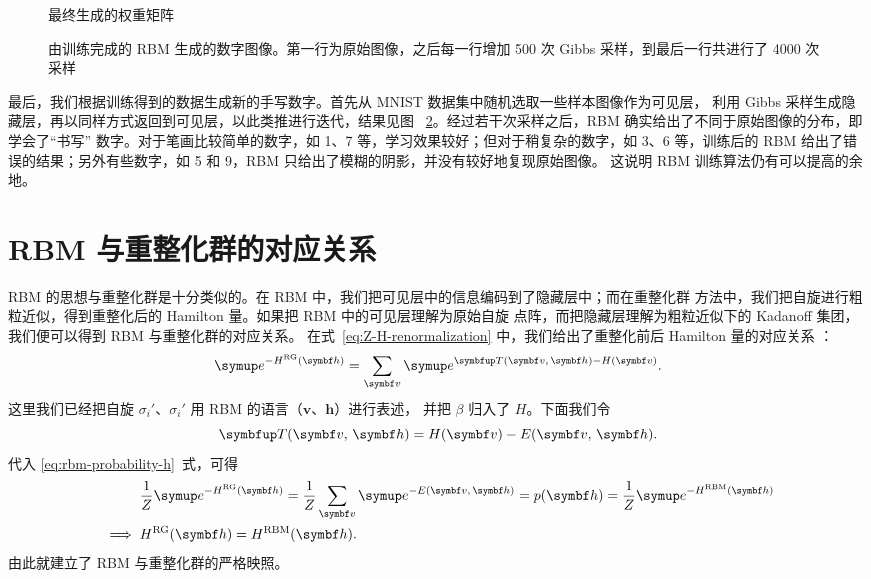 \begin{figure}[!htb]
  \centering
  \caption{最终生成的权重矩阵}
  \label{fig:mnist-weight}
\end{figure}

\begin{figure}[!htb]
  \centering
  \caption{由训练完成的 RBM 生成的数字图像。第一行为原始图像，之后每一行增加 \num{500} 次 Gibbs
    采样，到最后一行共进行了 \num{4000} 次采样}
  \label{fig:mnist-samples}
\end{figure}

最后，我们根据训练得到的数据生成新的手写数字。首先从 MNIST 数据集中随机选取一些样本图像作为可见层，
利用 Gibbs 采样生成隐藏层，再以同样方式返回到可见层，以此类推进行迭代，结果见图~%
\ref{fig:mnist-samples}。经过若干次采样之后，RBM 确实给出了不同于原始图像的分布，即学会了“书写”
数字。对于笔画比较简单的数字，如 1、7 等，学习效果较好；但对于稍复杂的数字，如 3、6 等，训练后的
RBM 给出了错误的结果；另外有些数字，如 5 和 9，RBM 只给出了模糊的阴影，并没有较好地复现原始图像。
这说明 RBM 训练算法仍有可以提高的余地。

\section{RBM 与重整化群的对应关系}

RBM 的思想与重整化群是十分类似的。在 RBM 中，我们把可见层中的信息编码到了隐藏层中；而在重整化群
方法中，我们把自旋进行粗粒近似，得到重整化后的 Hamilton 量。如果把 RBM 中的可见层理解为原始自旋
点阵，而把隐藏层理解为粗粒近似下的 Kadanoff 集团，我们便可以得到 RBM 与重整化群的对应关系。
在式~\eqref{eq:Z-H-renormalization} 中，我们给出了重整化前后 Hamilton 量的对应关系 \cite{exact}：
\begin{equation}
    \ee^{-H^{\text{RG}}(\bm{h})}
  = \sum_{\bm{v}} \ee^{\opT(\bm{v},\,\bm{h})-H(\bm{v})}.
\end{equation}
这里我们已经把自旋 $\sigma_i'$、$\sigma_i'$ 用 RBM 的语言（$\bm{v}$、$\bm{h}$）进行表述，
并把 $\beta$ 归入了 $H$。下面我们令
\begin{equation}
  \opT(\bm{v},\,\bm{h}) = H(\bm{v}) - E(\bm{v},\,\bm{h}).
\end{equation}
代入 \eqref{eq:rbm-probability-h}~式，可得
\begin{align}
  &\mathrel{\phantom{\implies}}
    \frac{1}{Z} \ee^{-H^{\text{RG}}(\bm{h})}
  = \frac{1}{Z} \sum_{\bm{v}} \ee^{-E(\bm{v},\,\bm{h})}
  = p(\bm{h})
  = \frac{1}{Z} \ee^{-H^{\text{RBM}}(\bm{h})} \notag \\
  &\implies H^{\text{RG}}(\bm{h}) = H^{\text{RBM}}(\bm{h}).
\end{align}
由此就建立了 RBM 与重整化群的严格映照。

